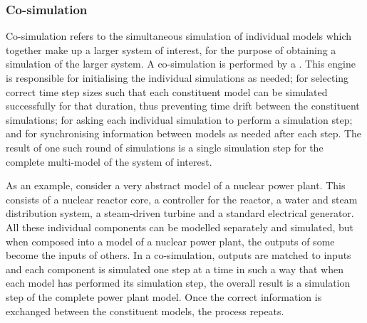\subsubsection{Co-simulation}
\label{sec:concepts:cosim}
Co-simulation refers to the simultaneous simulation of individual models which together make up a larger system of interest, for the purpose of obtaining a simulation of the larger system.
A co-simulation is performed by a .
This engine is responsible for initialising the individual simulations as needed;  for selecting correct time step sizes such that each constituent model can be simulated successfully for that duration, thus preventing time drift between the constituent simulations;  for asking each individual simulation to perform a simulation step;  and for synchronising information between models as needed after each step.
The result of one such round of simulations is a single simulation step for the complete multi-model of the system of interest.

As an example, consider a very abstract model of a nuclear power plant.
This consists of a nuclear reactor core, a controller for the reactor, a water and steam distribution system, a steam-driven turbine and a standard electrical generator.
All these individual components can be modelled separately and simulated, but when composed into a model of a nuclear power plant, the outputs of some become the inputs of others.
In a co-simulation, outputs are matched to inputs and each component is simulated one step at a time in such a way that when each model has performed its simulation step, the overall result is a simulation step of the complete power plant model.
Once the correct information is exchanged between the constituent models, the process repeats.

